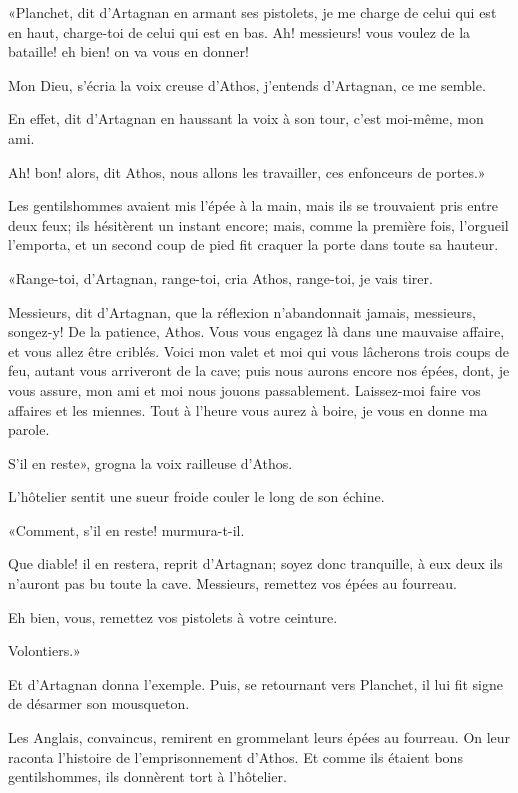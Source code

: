 «Planchet, dit d'Artagnan en armant ses pistolets, je me charge de celui qui est en haut, charge-toi de celui qui est en bas. Ah! messieurs! vous voulez de la bataille! eh bien! on va vous en donner! 

\speak  Mon Dieu, s'écria la voix creuse d'Athos, j'entends d'Artagnan, ce me semble. 

\speak  En effet, dit d'Artagnan en haussant la voix à son tour, c'est moi-même, mon ami. 

\speak  Ah! bon! alors, dit Athos, nous allons les travailler, ces enfonceurs de portes.» 

Les gentilshommes avaient mis l'épée à la main, mais ils se trouvaient pris entre deux feux; ils hésitèrent un instant encore; mais, comme la première fois, l'orgueil l'emporta, et un second coup de pied fit craquer la porte dans toute sa hauteur. 

«Range-toi, d'Artagnan, range-toi, cria Athos, range-toi, je vais tirer. 

\speak  Messieurs, dit d'Artagnan, que la réflexion n'abandonnait jamais, messieurs, songez-y! De la patience, Athos. Vous vous engagez là dans une mauvaise affaire, et vous allez être criblés. Voici mon valet et moi qui vous lâcherons trois coups de feu, autant vous arriveront de la cave; puis nous aurons encore nos épées, dont, je vous assure, mon ami et moi nous jouons passablement. Laissez-moi faire vos affaires et les miennes. Tout à l'heure vous aurez à boire, je vous en donne ma parole. 

\speak  S'il en reste», grogna la voix railleuse d'Athos. 

L'hôtelier sentit une sueur froide couler le long de son échine. 

«Comment, s'il en reste! murmura-t-il. 

\speak  Que diable! il en restera, reprit d'Artagnan; soyez donc tranquille, à eux deux ils n'auront pas bu toute la cave. Messieurs, remettez vos épées au fourreau. 

\speak  Eh bien, vous, remettez vos pistolets à votre ceinture. 

\speak  Volontiers.» 

Et d'Artagnan donna l'exemple. Puis, se retournant vers Planchet, il lui fit signe de désarmer son mousqueton. 

Les Anglais, convaincus, remirent en grommelant leurs épées au fourreau. On leur raconta l'histoire de l'emprisonnement d'Athos. Et comme ils étaient bons gentilshommes, ils donnèrent tort à l'hôtelier. 

